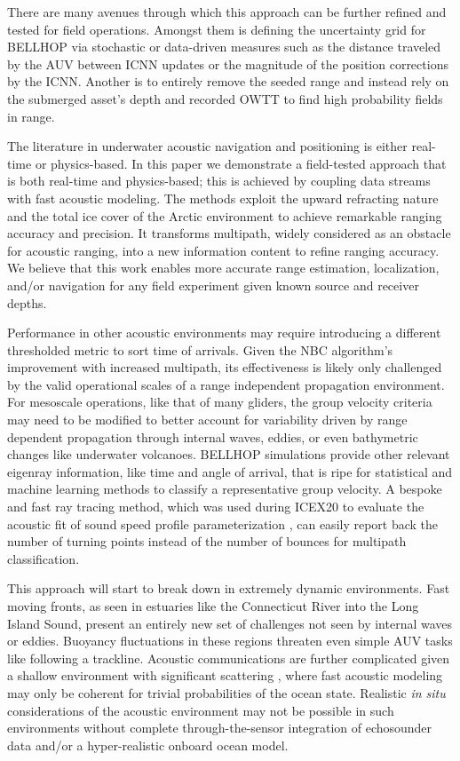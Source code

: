 There are many avenues through which this approach can be further refined and tested for field operations.
Amongst them is defining the uncertainty grid for BELLHOP via stochastic or data-driven measures such as the distance traveled by the AUV between ICNN updates or the magnitude of the position corrections by the ICNN.
Another is to entirely remove the seeded range and instead rely on the submerged asset's depth and recorded OWTT to find high probability fields in range.

The literature in underwater acoustic navigation and positioning is either real-time or physics-based.
In this paper we demonstrate a field-tested approach that is both real-time and physics-based; this is achieved by coupling data streams with fast acoustic modeling.
The methods exploit the upward refracting nature and the total ice cover of the Arctic environment to achieve remarkable ranging accuracy and precision.
It transforms multipath, widely considered as an obstacle for acoustic ranging, into a new information content to refine ranging accuracy.
We believe that this work enables more accurate range estimation, localization, and/or navigation for any field experiment given known source and receiver depths.

Performance in other acoustic environments may require introducing a different thresholded metric to sort time of arrivals.
Given the NBC algorithm's improvement with increased multipath, its effectiveness is likely only challenged by the valid operational scales of a range independent propagation environment.
For mesoscale operations, like that of many gliders, the group velocity criteria may need to be modified to better account for variability driven by range dependent propagation through internal waves, eddies, or even bathymetric changes like underwater volcanoes.
BELLHOP simulations provide other relevant eigenray information, like time and angle of arrival, that is ripe for statistical and machine learning methods to classify a representative group velocity.
A bespoke and fast ray tracing method, which was used during ICEX20 to evaluate the acoustic fit of sound speed profile parameterization \citep{bhatt_embedded_2021}, can easily report back the number of turning points instead of the number of bounces for multipath classification.

This approach will start to break down in extremely dynamic environments.
Fast moving fronts, as seen in estuaries like the Connecticut River into the Long Island Sound, present an entirely new set of challenges not seen by internal waves or eddies.
Buoyancy fluctuations in these regions threaten even simple AUV tasks like following a trackline.
Acoustic communications are further complicated given a shallow environment with significant scattering \citep{lavery_measurements_2010,ross_acoustic_2012,lavery_broadband_2013}, where fast acoustic modeling may only be coherent for trivial probabilities of the ocean state.
Realistic \textit{in situ} considerations of the acoustic environment may not be possible in such environments without complete through-the-sensor integration of echosounder data and/or a hyper-realistic onboard ocean model.

